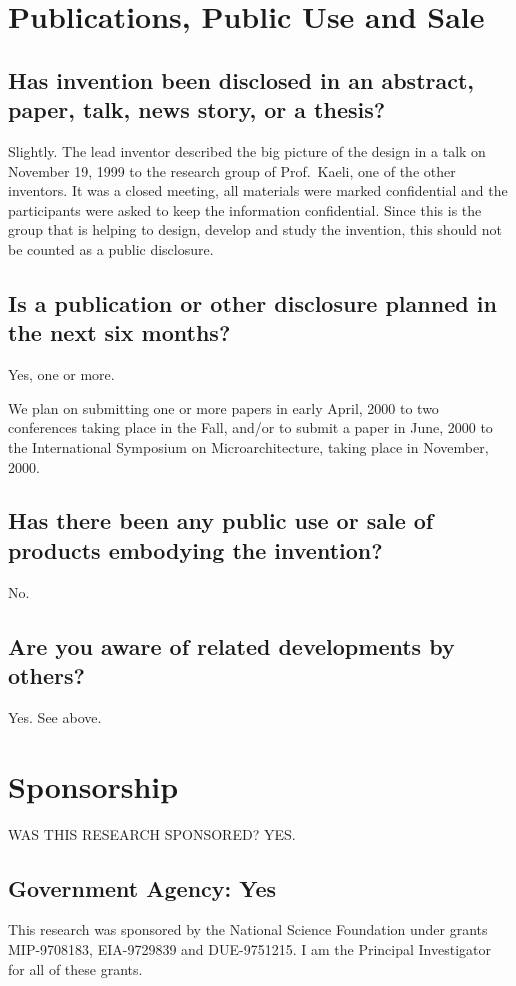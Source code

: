 \documentclass[10pt,dvips]{article}
\begin{document}
\newpage

\section{Publications, Public Use and Sale}
\subsection{Has invention been disclosed in an abstract, paper, talk, news story, or
a thesis?}
Slightly. The lead inventor
described the big picture of the design in a talk on November 19, 1999
to the research group of Prof.\ Kaeli, one of the other inventors. It was a closed
meeting, all materials were marked confidential and the participants were asked
to keep the information confidential. Since this is the group that is helping
to design, develop and study the invention, this should not be counted as
a public disclosure.

\subsection{Is a publication or other disclosure planned in the next six months?}
Yes, one or more.

We plan on submitting one or more papers in early April, 2000 to two conferences taking
place in the Fall, and/or to submit a paper in June, 2000 to the International
Symposium on
Microarchitecture, taking place in November, 2000.

\subsection{Has there been any public use or sale of products embodying the invention?}
No.

\subsection{Are you aware of related developments by others?} Yes. See above.

\newpage

\section{Sponsorship}
WAS THIS RESEARCH SPONSORED?	YES.

\subsection{Government Agency: Yes}
This research was sponsored by the National Science Foundation under grants
MIP-9708183, EIA-9729839 and DUE-9751215. I am the Principal Investigator for
all of these grants.
\end{document}
